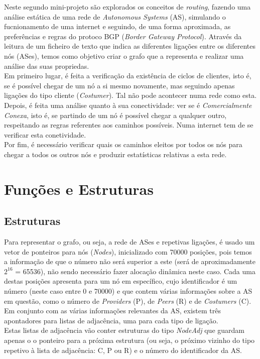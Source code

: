\documentclass[twocolumn]{article} %
\begin{document}
		Neste segundo mini-projeto são explorados os conceitos de \emph{routing}, fazendo uma análise estática de uma rede de \emph{Autonomous Systems} (AS), simulando o fucnionamento de uma internet e seguindo, de uma forma aproximada, as preferências e regras do protoco BGP (\emph{Border Gateway Protocol}). Através da leitura de um ficheiro de texto que indica as diferentes ligações entre os diferentes nós (ASes), temos como objetivo criar o grafo que a representa e realizar uma análise das suas propriedas.\\
		\noindent Em primeiro lugar, é feita a verificação da existência de ciclos de clientes, isto  é, se é possível chegar de um nó a si mesmo novamente, mas seguindo apenas ligações do tipo cliente (\emph{Costumer}). Tal não pode acontecer numa rede como esta.\\
		\noindent Depois, é feita uma análise quanto à sua conectividade: ver se é \emph{Comercialmente Conexa}, isto é, se partindo de um nó é possível chegar a qualquer outro, respeitando as regras referentes aos caminhos possíveis. Numa internet tem de se verificar esta conetividade.\\
		\noindent Por fim, é necessário verificar quais os caminhos eleitos por todos os nós para chegar a todos os outros nós e produzir estatísticas relativas a esta rede.


	\section{Funções e Estruturas}
		\subsection{Estruturas}
 
			Para representar o grafo, ou seja, a rede de ASes e repetivas ligações, é usado um vetor de ponteiros para nós (\emph{Nodes}), inicializado com 70000 posições, pois temos a informação de que o número não será superior a este (será de aproximadamente $2^{16}$ = 65536), não sendo necessário fazer alocação dinâmica neste caso. Cada uma destas posições apresenta para um nó em específico, cujo identificador é um número (neste caso entre 0 e 70000) e que contem várias informações sobre a AS em questão, como o número de \emph{Providers} (P), de \emph{Peers} (R) e de \emph{Costumers} (C). Em conjunto com as várias informações relevantes da AS, existem três apontadores para listas de adjacência, uma para cada tipo de ligação.\\
			\noindent Estas listas de adjacência vão conter estruturas do tipo \emph{NodeAdj} que guardam apenas o o ponteiro para a próxima estrutura (ou seja, o próximo vizinho do tipo repetivo à lista de adjacência: C, P ou R) e o número do identificador da AS.
\end{document}
